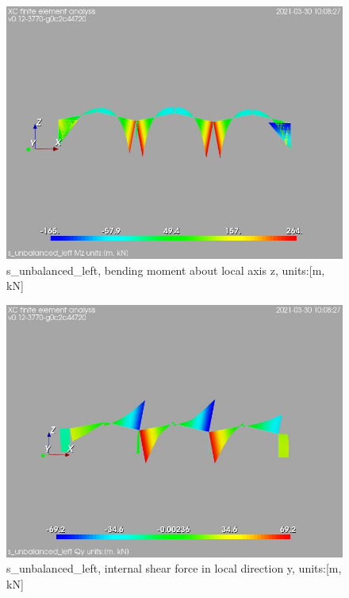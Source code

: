 \begin{figure}
\begin{center}
\includegraphics[width=\linewidth]{calc_results/sole_zeinali/text/graphics/resSimplLC/s_unbalanced_leftallMemberSetMz}
\caption{s_unbalanced_left, bending moment about local axis z, units:[m, kN]}
\end{center}
\end{figure}
\begin{figure}
\begin{center}
\includegraphics[width=\linewidth]{calc_results/sole_zeinali/text/graphics/resSimplLC/s_unbalanced_leftallMemberSetQy}
\caption{s_unbalanced_left, internal shear force in local direction y, units:[m, kN]}
\end{center}
\end{figure}
